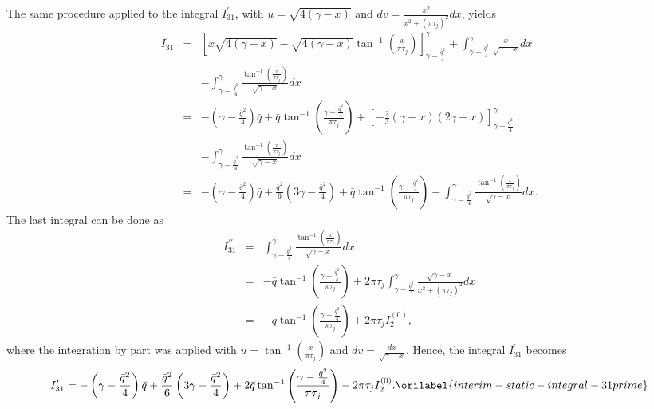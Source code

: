 \documentclass[aps,showkeys,noshowpacs,superscriptaddress,pre,preprint]{revtex4-2}
\let\label\orilabel
\begin{document}
The same procedure applied to the integral $I_{31}^\prime$,
with $u = \sqrt{4 \left( \gamma - x \right)}$ and $dv = \frac{x^2}{x^2 + \left( \pi \tau_j \right)^2} dx$,
yields
\begin{eqnarray*}
I_{31}^\prime &=& \left[ x \sqrt{4 \left( \gamma - x \right)}
- \sqrt{4 \left( \gamma - x \right)} \tan^{-1}\left( \frac{x}{\pi \tau_j } \right)
\right]_{\gamma - \frac{\bar{q}^2}{4}}^{\gamma}
+ \int_{\gamma - \frac{\bar{q}^2}{4}}^{\gamma} \frac{x}{\sqrt{\gamma - x}} dx
\\
& & 
- \int_{\gamma - \frac{\bar{q}^2}{4}}^{\gamma}  \frac{\tan^{-1}\left( \frac{x}{\pi \tau_j} \right)}{\sqrt{\gamma - x}} dx
\\
&=& - \left( \gamma - \frac{\bar{q}^2}{4} \right) \bar{q} + \bar{q} \tan^{-1}\left( \frac{\gamma - \frac{\bar{q}^2}{4}}{\pi \tau_j} \right)
+ \left[ - \frac{2}{3} \left( \gamma - x \right) \left( 2\gamma + x \right) \right]_{\gamma - \frac{\bar{q}^2}{4}}^{\gamma} 
\\
& & 
- \int_{\gamma - \frac{\bar{q}^2}{4}}^{\gamma}  \frac{\tan^{-1}\left( \frac{x}{\pi \tau_j} \right)}{\sqrt{\gamma - x}} dx
\\
&=& - \left( \gamma - \frac{\bar{q}^2}{4} \right) \bar{q} 
+ \frac{\bar{q}^2}{6} \left( 3 \gamma - \frac{\bar{q}^2}{4} \right)
+ \bar{q} \tan^{-1}\left( \frac{\gamma - \frac{\bar{q}^2}{4}}{\pi \tau_j} \right)
- \int_{\gamma - \frac{\bar{q}^2}{4}}^{\gamma}  \frac{\tan^{-1}\left( \frac{x}{\pi \tau_j} \right)}{\sqrt{\gamma - x}} dx .
\end{eqnarray*}
The last integral can be done as
\begin{eqnarray*}
I_{31}^{\prime\prime} 
&=& \int_{\gamma - \frac{\bar{q}^2}{4}}^{\gamma}  \frac{\tan^{-1}\left( \frac{x}{\pi \tau_j} \right)}{\sqrt{\gamma - x}} dx
\\
&=& - \bar{q} \tan^{-1}\left( \frac{\gamma - \frac{\bar{q}^2}{4}}{\pi \tau_j} \right)
+ 2 \pi \tau_j  \int_{\gamma - \frac{\bar{q}^2}{4}}^{\gamma} \frac{\sqrt{ \gamma - x}}{x^2 + \left( \pi \tau_j \right)^2} dx 
\\
&=& - \bar{q} \tan^{-1}\left( \frac{\gamma - \frac{\bar{q}^2}{4}}{\pi \tau_j} \right) + 2 \pi \tau_j I_2^{(0)} ,
\end{eqnarray*}
where the integration by part was applied with $u = \tan^{-1}\left( \frac{x}{\pi \tau_j} \right)$
and $dv = \frac{dx}{\sqrt{\gamma - x}}$.
Hence, the integral $I_{31}^\prime$ becomes
\begin{equation}
I_{31}^\prime = - \left( \gamma - \frac{\bar{q}^2}{4} \right) \bar{q} 
+ \frac{\bar{q}^2}{6} \left( 3 \gamma - \frac{\bar{q}^2}{4} \right)
+ 2 \bar{q} \tan^{-1}\left( \frac{\gamma - \frac{\bar{q}^2}{4}}{\pi \tau_j} \right)
- 2 \pi \tau_j I_2^{(0)} .
\label{interim-static-integral-31prime}
\end{equation}
\end{document}

